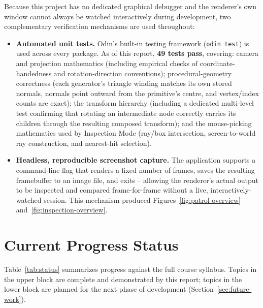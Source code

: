\documentclass[11pt,a4paper]{article}
\begin{document}
Because this project has no dedicated graphical debugger and the
renderer's own window cannot always be watched interactively during
development, two complementary verification mechanisms are used
throughout:

\begin{itemize}[nosep]
  \item \textbf{Automated unit tests.} Odin's built-in testing framework
        (\texttt{odin test}) is used across every package. As of this
        report, \textbf{49 tests pass}, covering: camera and projection
        mathematics (including empirical checks of coordinate-handedness
        and rotation-direction conventions); procedural-geometry
        correctness (each generator's triangle winding matches its own
        stored normals, normals point outward from the primitive's
        centre, and vertex/index counts are exact); the transform
        hierarchy (including a dedicated multi-level test confirming
        that rotating an intermediate node correctly carries its
        children through the resulting composed transform); and the
        mouse-picking mathematics used by Inspection Mode (ray/box
        intersection, screen-to-world ray construction, and nearest-hit
        selection).
  \item \textbf{Headless, reproducible screenshot capture.} The
        application supports a command-line flag that renders a fixed
        number of frames, saves the resulting framebuffer to an image
        file, and exits -- allowing the renderer's actual output to be
        inspected and compared frame-for-frame without a live,
        interactively-watched session. This mechanism produced
        Figures~\ref{fig:patrol-overview} and~\ref{fig:inspection-overview}.
\end{itemize}

\section{Current Progress Status}
\label{sec:status}

Table~\ref{tab:status} summarizes progress against the full course
syllabus. Topics in the upper block are complete and demonstrated by
this report; topics in the lower block are planned for the next phase of
development (Section~\ref{sec:future-work}).
\end{document}
